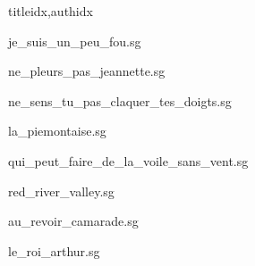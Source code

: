 \documentclass[
    ]{article}
\begin{document}
\begin{songs}{titleidx,authidx}

{je_suis_un_peu_fou.sg}


{ne_pleurs_pas_jeannette.sg}


{ne_sens_tu_pas_claquer_tes_doigts.sg}


{la_piemontaise.sg}


{qui_peut_faire_de_la_voile_sans_vent.sg}


{red_river_valley.sg}


{au_revoir_camarade.sg}


{le_roi_arthur.sg}



\end{songs}
\end{document}
